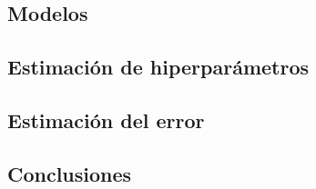 \documentclass[a4paper, 20pt]{article}
\begin{document}
\subsection{Modelos}


\subsection{Estimación de hiperparámetros}

\subsection{Estimación del error}

\subsection{Conclusiones}
\newpage

\printbibliography
\end{document}
